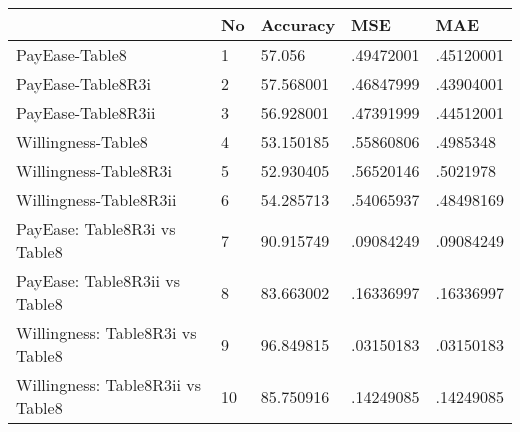 \begin{table}[htbp]
\begin{tabular}{|l|l|l|l|l|}\hline  
 & No  & Accuracy  & MSE  & MAE  \\ \hline  
PayEase-Table8 & 1 & 57.056 & .49472001 & .45120001 \\ \hline 
PayEase-Table8R3i & 2 & 57.568001 & .46847999 & .43904001 \\ \hline 
PayEase-Table8R3ii & 3 & 56.928001 & .47391999 & .44512001 \\ \hline 
Willingness-Table8 & 4 & 53.150185 & .55860806 & .4985348 \\ \hline 
Willingness-Table8R3i & 5 & 52.930405 & .56520146 & .5021978 \\ \hline 
Willingness-Table8R3ii & 6 & 54.285713 & .54065937 & .48498169 \\ \hline 
PayEase: Table8R3i vs Table8  & 7 & 90.915749 & .09084249 & .09084249 \\ \hline 
PayEase: Table8R3ii vs Table8& 8 & 83.663002 & .16336997 & .16336997 \\ \hline 
Willingness: Table8R3i vs Table8  & 9 & 96.849815 & .03150183 & .03150183 \\ \hline 
Willingness: Table8R3ii vs Table8& 10 & 85.750916 & .14249085 & .14249085 \\ \hline 
  \end{tabular}
\end{table}
